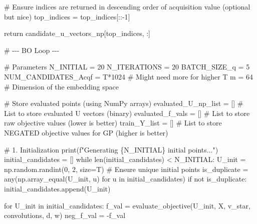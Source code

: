 \documentclass[
  letterpaper,
  DIV=11,
  numbers=noendperiod]{scrartcl}
\newenvironment{Shaded}{\begin{snugshade}}{\end{snugshade}}
\newcommand{\BuiltInTok}[1]{\textcolor[rgb]{0.00,0.23,0.31}{#1}}
\newcommand{\CommentTok}[1]{\textcolor[rgb]{0.37,0.37,0.37}{#1}}
\newcommand{\ControlFlowTok}[1]{\textcolor[rgb]{0.00,0.23,0.31}{#1}}
\newcommand{\DecValTok}[1]{\textcolor[rgb]{0.68,0.00,0.00}{#1}}
\newcommand{\KeywordTok}[1]{\textcolor[rgb]{0.00,0.23,0.31}{#1}}
\newcommand{\NormalTok}[1]{\textcolor[rgb]{0.00,0.23,0.31}{#1}}
\newcommand{\OperatorTok}[1]{\textcolor[rgb]{0.37,0.37,0.37}{#1}}
\newcommand{\SpecialCharTok}[1]{\textcolor[rgb]{0.37,0.37,0.37}{#1}}
\newcommand{\SpecialStringTok}[1]{\textcolor[rgb]{0.13,0.47,0.30}{#1}}
\begin{document}
\begin{Shaded}
\begin{Highlighting}[]
    \CommentTok{\# Ensure indices are returned in descending order of acquisition value (optional but nice)}
\NormalTok{    top\_indices }\OperatorTok{=}\NormalTok{ top\_indices[::}\OperatorTok{{-}}\DecValTok{1}\NormalTok{]}

    \ControlFlowTok{return}\NormalTok{ candidate\_u\_vectors\_np[top\_indices, :]}


\CommentTok{\# {-}{-}{-} BO Loop {-}{-}{-}}

\CommentTok{\# Parameters}
\NormalTok{N\_INITIAL }\OperatorTok{=} \DecValTok{20}
\NormalTok{N\_ITERATIONS }\OperatorTok{=} \DecValTok{20}
\NormalTok{BATCH\_SIZE\_q }\OperatorTok{=} \DecValTok{5}
\NormalTok{NUM\_CANDIDATES\_Acqf }\OperatorTok{=}\NormalTok{ T}\OperatorTok{*}\DecValTok{1024} \CommentTok{\# Might need more for higher T}
\NormalTok{m }\OperatorTok{=} \DecValTok{64} \CommentTok{\# Dimension of the embedding space}

\CommentTok{\# Store evaluated points (using NumPy arrays)}
\NormalTok{evaluated\_U\_np\_list }\OperatorTok{=}\NormalTok{ [] }\CommentTok{\# List to store evaluated U vectors (binary)}
\NormalTok{evaluated\_f\_vals }\OperatorTok{=}\NormalTok{ []    }\CommentTok{\# List to store raw objective values (lower is better)}
\NormalTok{train\_Y\_list }\OperatorTok{=}\NormalTok{ []        }\CommentTok{\# List to store NEGATED objective values for GP (higher is better)}

\CommentTok{\# 1. Initialization}
\BuiltInTok{print}\NormalTok{(}\SpecialStringTok{f"Generating }\SpecialCharTok{\{}\NormalTok{N\_INITIAL}\SpecialCharTok{\}}\SpecialStringTok{ initial points..."}\NormalTok{)}
\NormalTok{initial\_candidates }\OperatorTok{=}\NormalTok{ []}
\ControlFlowTok{while} \BuiltInTok{len}\NormalTok{(initial\_candidates) }\OperatorTok{\textless{}}\NormalTok{ N\_INITIAL:}
\NormalTok{    U\_init }\OperatorTok{=}\NormalTok{ np.random.randint(}\DecValTok{0}\NormalTok{, }\DecValTok{2}\NormalTok{, size}\OperatorTok{=}\NormalTok{T)}
    \CommentTok{\# Ensure unique initial points}
\NormalTok{    is\_duplicate }\OperatorTok{=} \BuiltInTok{any}\NormalTok{(np.array\_equal(U\_init, u) }\ControlFlowTok{for}\NormalTok{ u }\KeywordTok{in}\NormalTok{ initial\_candidates)}
    \ControlFlowTok{if} \KeywordTok{not}\NormalTok{ is\_duplicate:}
\NormalTok{        initial\_candidates.append(U\_init)}

\ControlFlowTok{for}\NormalTok{ U\_init }\KeywordTok{in}\NormalTok{ initial\_candidates:}
\NormalTok{    f\_val }\OperatorTok{=}\NormalTok{ evaluate\_objective(U\_init, X, v\_star, convolutions, d, w)}
\NormalTok{    neg\_f\_val }\OperatorTok{=} \OperatorTok{{-}}\NormalTok{f\_val}


\end{Highlighting}
\end{Shaded}
\end{document}

